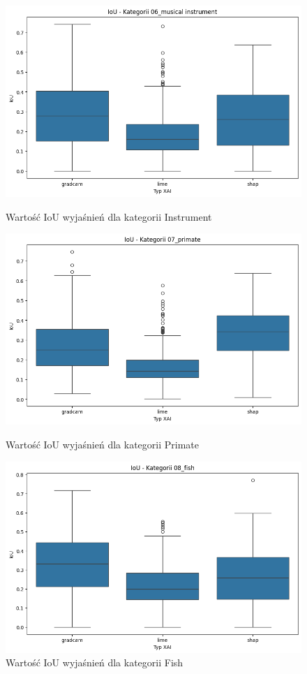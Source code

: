 \begin{figure}
	\centering
	\begin{minipage}[b]{0.3\textwidth}
		\centering\includegraphics[width=.9\textwidth]{img/base_iou_music}
		\caption{Wartość IoU wyjaśnień dla kategorii Instrument}  \label{rys:base_iou_music}
	\end{minipage}
	\begin{minipage}[b]{0.3\textwidth}
		\centering\includegraphics[width=.9\textwidth]{img/base_iou_primate}
		\caption{Wartość IoU wyjaśnień dla kategorii Primate}  \label{rys:base_iou_primate}
	\end{minipage}
	\begin{minipage}[b]{0.3\textwidth}
		\centering\includegraphics[width=.9\textwidth]{img/base_iou_fish}
		\caption{Wartość IoU wyjaśnień dla kategorii Fish}  \label{rys:base_iou_fish}
	\end{minipage}
\end{figure}

